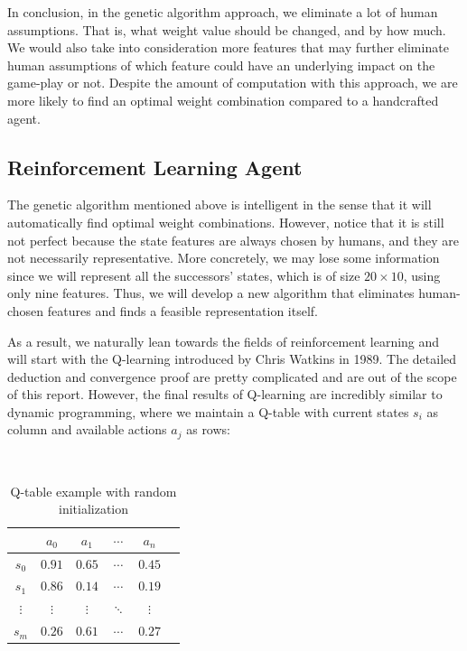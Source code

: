 \documentclass[letterpaper]{article} %
\begin{document}
In conclusion, in the genetic algorithm approach, we eliminate a lot of human assumptions. That is, what weight value should be changed, and by how much. We would also take into consideration more features that may further eliminate human assumptions of which feature could have an underlying impact on the game-play or not. Despite the amount of computation with this approach, we are more likely to find an optimal weight combination compared to a handcrafted agent.


\subsection{Reinforcement Learning Agent}

The genetic algorithm mentioned above is intelligent in the sense that it will automatically find optimal weight combinations. However, notice that it is still not perfect because the state features are always chosen by humans, and they are not necessarily representative. More concretely, we may lose some information since we will represent all the successors' states, which is of size $20\times 10$, using only nine features. Thus, we will develop a new algorithm that eliminates human-chosen features and finds a feasible representation itself.

As a result, we naturally lean towards the fields of reinforcement learning and will start with the Q-learning introduced by Chris Watkins in 1989. The detailed deduction and convergence proof are pretty complicated and are out of the scope of this report. However, the final results of Q-learning are incredibly similar to dynamic programming, where we maintain a Q-table with current states $s_i$ as column and available actions $a_j$ as rows:

$\,$
\begin{table}[h!]
  \centering
  \normalsize{
    \begin{tabular}{ |c|c|c|c|c|c| } 
      \hline
       & $a_{0}$ & $a_{1}$ & $\cdots$ & $a_{n}$  \\ 
      \hline
       $s_{0}$ & $0.91$ & $0.65$ &$\cdots $ &$0.45$  \\ 
       \hline
       $s_{1}$ & $0.86$ & $0.14$ &$\cdots $ &$0.19$  \\ 
       \hline
       $\vdots$ & $\vdots$ & $\vdots$ &$\ddots $ &$\vdots$  \\ 
       \hline
       $s_{m}$ & $0.26$ & $0.61$ &$\cdots $ &$0.27$  \\ 
       \hline
      \end{tabular}}
  \caption{Q-table example with random initialization}
  \label{tab:qtable}
\end{table}
\end{document}
